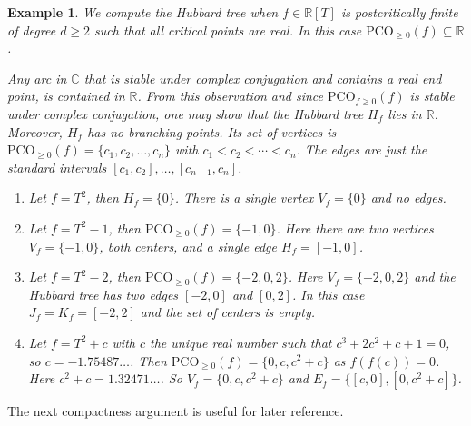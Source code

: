 \documentclass[12pt,oneside,a4]{amsart}
\newcommand{\IC}{\mathbb{C}}
\newcommand{\IR}{\mathbb{R}}
\newcounter{maincounter}
\numberwithin{maincounter}{section}
\numberwithin{equation}{section}
\newtheorem{example}[maincounter]{Example}
\renewcommand{\subset}{\subseteq}
\newcommand{\pco}{\mathrm{PCO}}
\begin{document}
\begin{example}
  We compute the Hubbard tree when $f\in\IR[T]$ is postcritically
  finite of degree $d\ge 2$ such that all critical points are real.
  In this case $\pco_{\ge 0}(f)\subset \IR$.

  Any arc in $\IC$ that is stable under complex
  conjugation and contains a real end point, is contained in $\IR$.
  From this observation and since $\pco_{f\ge 0}(f)$ is stable under
  complex conjugation,  one may show that the Hubbard tree $H_f$ lies
  in $\IR$.  Moreover, $H_f$ has
  no branching points.  Its set of vertices is 
  $\pco_{\ge 0}(f) = \{c_1,c_2,\ldots,c_n\}$ with $c_1<c_2<\cdots <
  c_n$. The  edges are just the standard intervals
  $[c_1,c_2],\ldots,[c_{n-1},c_n]$.


  \label{ex:hubbardtrees}
  \begin{enumerate} 
  \item[(i)] Let $f = T^2$, then $H_f = \{0\}$. There is a single vertex
    $V_f = \{0\}$ and no edges.
  \item[(ii)] Let $f = T^2-1$, then $\pco_{\ge 0}(f) = \{-1,0\}$.
    Here there are two
    vertices $V_f = \{-1,0\}$, both centers, and
    a single edge $H_f=[-1,0]$.
  \item[(iii)] Let $f = T^2-2$, then $\pco_{\ge 0}(f) = \{-2,0,2\}$.
    Here $V_f =
    \{-2,0,2\}$ and the Hubbard tree has
    two edges  $[-2,0]$ and $[0,2]$. In this case $J_f=K_f=[-2,2]$ and
    the set of centers is empty. 
  \item[(iv)] Let $f = T^2+c$ with $c$ the unique real number such that
    $c^3+2c^2+c+1=0$, so $c = -1.75487\ldots$. Then $\pco_{\ge 0}(f) =
    \{0,c,c^2+c\}$ as $f(f(c))=0$. Here $c^2+c = 1.32471\ldots$.
    So $V_f = \{0,c,c^2+c\}$ and $E_f =
    \{[c,0],[0,c^2+c]\}$.
  \end{enumerate}
\end{example}


The next compactness argument is useful for later reference. 
\end{document}
